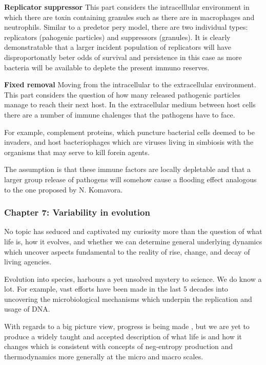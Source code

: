 \noindent
\textbf{Replicator suppressor}
This part considers the intracelllular environment in which there are toxin containing granules such as there are in macrophages and neutrophils.  Similar to a predetor pery model,  there are two individual types: replicators (pahogenic particles) and suppressors (granules).  It is clearly demonstratable that a larger incident population of replicators will have disproportonatly beter odds of survival and persistence in this case as more bacteria will be available to deplete the present immuno reserves. 


\noindent
\textbf{Fixed removal}
Moving from the intracellular to the extracellular environment. This part considers the question of how many released pathogenic particles manage to reach their next host.  In the extracellular medium between host cells there are a number of immune chalenges that the pathogens have to face. \par
For example,  complement proteins, which puncture bacterial cells deemed to be invaders,  and host bacteriophages which are viruses living in simbiosis with the organisms that may serve to kill forein agents. \par
The assumption is that these immune factors are locally depletable and that a larger group release of pathogens will somehow cause a flooding effect analogous to the one proposed by N. Komavora. 


\subsubsection{Chapter 7: Variability in evolution}
No topic has seduced and captivated my curiosity more than the question of what life is,  how it evolves,  and whether we can determine general underlying dynamics which uncover aspects fundamental to the reality of rise,  change,  and decay of living agencies. \par

Evolution into species, harbours a yet unsolved mystery to science.  We do know a lot.  For example,  vast efforts have been made in the last 5 decades into uncovering the microbiological mechanisms which underpin the replication and usage of DNA. \par


With regards to a big picture view,  progress is being made \cite{sharma2023assembly},  but we are yet to produce a widely taught and accepted description of what life is and how it changes which is consistent with concepts of neg-entropy production and thermodynamics more generally at the micro and macro scales. \par

